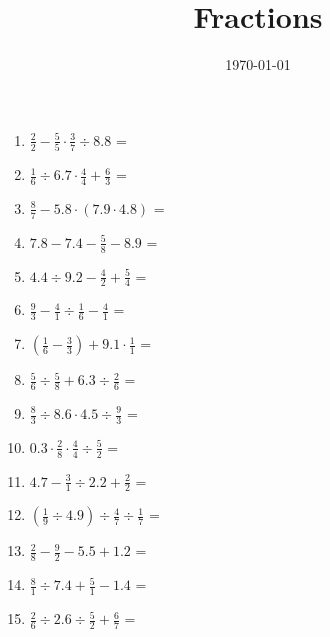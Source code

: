 \documentclass[a4paper,12pt,wide]{article} %
\title{Fractions}
\date{\today}
\begin{document}
\maketitle

\begin{enumerate}
\large
\item $\frac{2}{2} - \frac{5}{5} \cdot \frac{3}{7} \div 8.8$ =
\vspace{2ex}
\item $\frac{1}{6} \div 6.7 \cdot \frac{4}{4} + \frac{6}{3}$ =
\vspace{2ex}
\item $\frac{8}{7} - 5.8 \cdot (7.9 \cdot 4.8)$ =
\vspace{2ex}
\item $7.8 - 7.4 - \frac{5}{8} - 8.9$ =
\vspace{2ex}
\item $4.4 \div 9.2 - \frac{4}{2} + \frac{5}{4}$ =
\vspace{2ex}
\item $\frac{9}{3} - \frac{4}{1} \div \frac{1}{6} - \frac{4}{1}$ =
\vspace{2ex}
\item $(\frac{1}{6} - \frac{3}{3}) + 9.1 \cdot \frac{1}{1}$ =
\vspace{2ex}
\item $\frac{5}{6} \div \frac{5}{8} + 6.3 \div \frac{2}{6}$ =
\vspace{2ex}
\item $\frac{8}{3} \div 8.6 \cdot 4.5 \div \frac{9}{3}$ =
\vspace{2ex}
\item $0.3 \cdot \frac{2}{8} \cdot \frac{4}{4} \div \frac{5}{2}$ =
\vspace{2ex}
\item $4.7 - \frac{3}{1} \div 2.2 + \frac{2}{2}$ =
\vspace{2ex}
\item $(\frac{1}{9} \div 4.9) \div \frac{4}{7} \div \frac{1}{7}$ =
\vspace{2ex}
\item $\frac{2}{8} - \frac{9}{2} - 5.5 + 1.2$ =
\vspace{2ex}
\item $\frac{8}{1} \div 7.4 + \frac{5}{1} - 1.4$ =
\vspace{2ex}
\item $\frac{2}{6} \div 2.6 \div \frac{5}{2} + \frac{6}{7}$ =
\vspace{2ex}
\end{enumerate}
\end{document}

